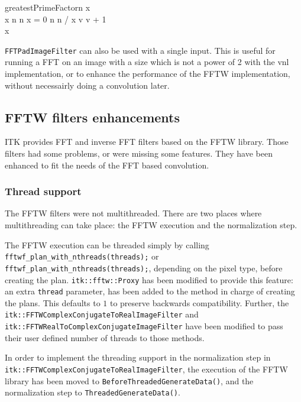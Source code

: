 \documentclass{InsightArticle}
\begin{document}
\begin{pseudocode}{greatestPrimeFactor}{n}
\label{greatestPrimeFactor}
x  \\
\WHILE x \leq n \DO
\BEGIN
  \IF n \bmod x = 0 \AND {}
  \THEN
    n \GETS n / x
  \ELSE
    v \GETS v + 1
\END \\
\RETURN x
\end{pseudocode}

\verb$FFTPadImageFilter$ can also be used with a single input. This is useful for running a FFT
on an image with a size which is not a power of 2 with the vnl implementation, or to enhance the performance
of the FFTW implementation, without necessairly doing a convolution later.

\subsection{FFTW filters enhancements}

ITK provides FFT and inverse FFT filters based on the FFTW library. Those filters had some problems,
or were missing some features. They have been enhanced to fit the needs of the FFT based convolution.

\subsubsection{Thread support}
The FFTW filters were not multithreaded. There are two places where multithreading can take place: the
FFTW execution and the normalization step.

The FFTW execution can be threaded simply by calling \verb$fftwf_plan_with_nthreads(threads);$ or 
\verb$fftwf_plan_with_nthreads(threads);$, depending on the pixel type, before creating the plan. 
\verb$itk::fftw::Proxy$ has been modified to provide this feature: an extra \verb$thread$ parameter,
has been added to the method in charge of creating the plans. This defaults
to $1$ to preserve backwards compatibility.
Further, the \verb$itk::FFTWComplexConjugateToRealImageFilter$ and
\verb$itk::FFTWRealToComplexConjugateImageFilter$ have
been modified to pass their user defined number of threads to those methods.

In order to implement the threading support in the normalization step in 
\verb$itk::FFTWComplexConjugateToRealImageFilter$, the execution of the FFTW library has been moved to 
\verb$BeforeThreadedGenerateData()$, and the normalization step to \verb$ThreadedGenerateData()$.
\end{document}
